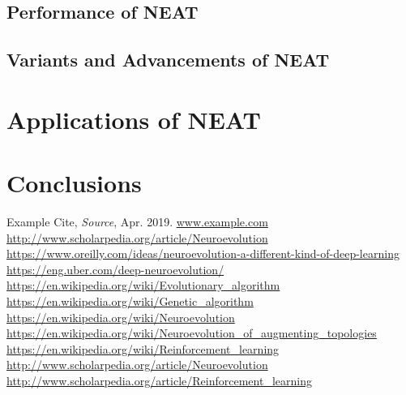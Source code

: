 \documentclass[journal, a4paper]{IEEEtran}
\begin{document}
\subsection{Performance of NEAT}
    
\subsection{Variants and Advancements of NEAT}




\section{Applications of NEAT}




\section{Conclusions}

\blindtext




\begin{thebibliography}{5}

    Example Cite, {\em Source}, Apr. 2019.
    \url{www.example.com}
    \url{http://www.scholarpedia.org/article/Neuroevolution}
    \url{https://www.oreilly.com/ideas/neuroevolution-a-different-kind-of-deep-learning}
    \url{https://eng.uber.com/deep-neuroevolution/}
    \url{https://en.wikipedia.org/wiki/Evolutionary_algorithm}
    \url{https://en.wikipedia.org/wiki/Genetic_algorithm}
    \url{https://en.wikipedia.org/wiki/Neuroevolution}
    \url{https://en.wikipedia.org/wiki/Neuroevolution_of_augmenting_topologies}
    \url{https://en.wikipedia.org/wiki/Reinforcement_learning}
    \url{http://www.scholarpedia.org/article/Neuroevolution}
    \url{http://www.scholarpedia.org/article/Reinforcement_learning}

\end{thebibliography}
\end{document}
